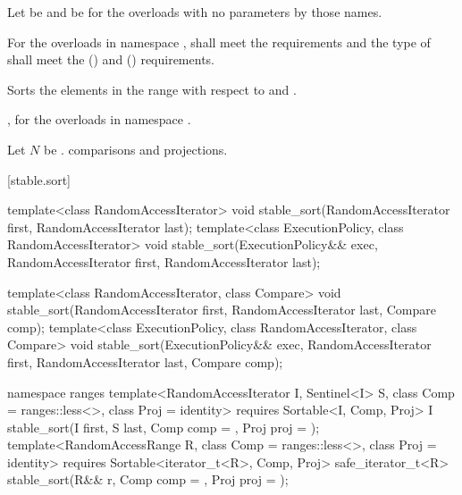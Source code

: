 \begin{itemdescr}
\pnum
Let  be 
and  be 
for the overloads with no parameters by those names.

\pnum
\requires
For the overloads in namespace ,
 shall meet the
 requirements and
the type of  shall meet the
 () and
 () requirements.

\pnum
\effects
Sorts the elements in the range
 with respect to  and .

\pnum
\returns
{}, for the overloads in namespace .

\pnum
\complexity
Let $N$ be .
 comparisons and projections.
\end{itemdescr}

[stable.sort]{}

%
\begin{itemdecl}
template<class RandomAccessIterator>
  void stable_sort(RandomAccessIterator first, RandomAccessIterator last);
template<class ExecutionPolicy, class RandomAccessIterator>
  void stable_sort(ExecutionPolicy&& exec,
                   RandomAccessIterator first, RandomAccessIterator last);

template<class RandomAccessIterator, class Compare>
  void stable_sort(RandomAccessIterator first, RandomAccessIterator last,
                   Compare comp);
template<class ExecutionPolicy, class RandomAccessIterator, class Compare>
  void stable_sort(ExecutionPolicy&& exec,
                   RandomAccessIterator first, RandomAccessIterator last,
                   Compare comp);

namespace ranges {
  template<RandomAccessIterator I, Sentinel<I> S, class Comp = ranges::less<>,
      class Proj = identity>
    requires Sortable<I, Comp, Proj>
    I stable_sort(I first, S last, Comp comp = {}, Proj proj = {});
  template<RandomAccessRange R, class Comp = ranges::less<>, class Proj = identity>
    requires Sortable<iterator_t<R>, Comp, Proj>
    safe_iterator_t<R>
      stable_sort(R&& r, Comp comp = {}, Proj proj = {});
}
\end{itemdecl}

